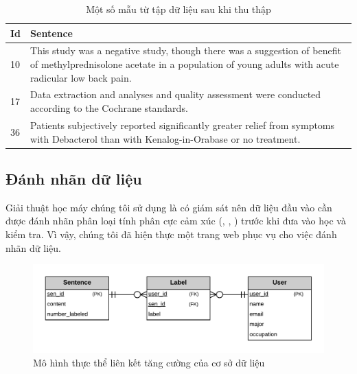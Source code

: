 \begin{table}[h]
\centering
\begin{minipage}{1.0\textwidth}
\caption{Một số mẫu từ tập dữ liệu sau khi thu thập} \label{table:data}
\begin{tabular}{|l| m{} | } 
\hline
\textbf{Id} & \textbf{Sentence} \\ \hline
10 & This study was a negative study, though there was a suggestion of benefit of methylprednisolone acetate in a population of young adults with acute radicular low back pain. \\ \hline
17 & Data extraction and analyses and quality assessment were conducted according to the Cochrane standards. \\ \hline
36 & Patients subjectively reported significantly greater relief from symptoms with Debacterol than with Kenalog-in-Orabase or no treatment. \\ \hline
\end{tabular}
\end{minipage}
\end{table}

\subsection*{Đánh nhãn dữ liệu}
Giải thuật học máy chúng tôi sử dụng là có giám sát nên dữ liệu đầu vào cần được đánh nhãn phân loại tính phân cực cảm xúc (\tichcuc, \tieucuc, \trungtinh) trước khi đưa vào học và kiểm tra. Vì vậy, chúng tôi đã hiện thực một trang web phục vụ cho việc đánh nhãn dữ liệu.\\

\begin{figure}[h]
\centering
\includegraphics[scale=0.25]{../hinh/EERD.png}
\caption{Mô hình thực thể liên kết tăng cường của cơ sở dữ liệu}
\label{fig:SQL}
\end{figure}

